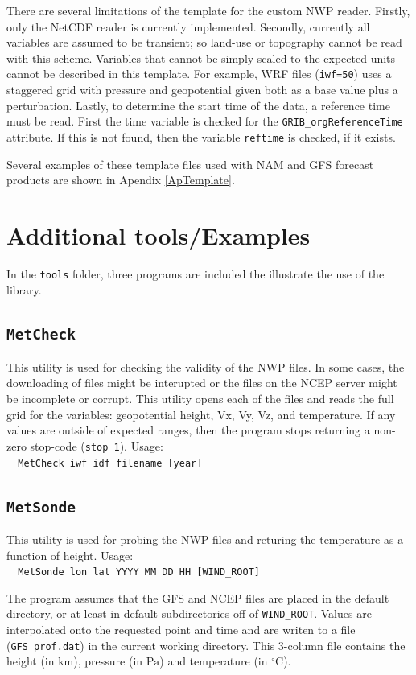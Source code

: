 \documentclass[11pt]{article}   %
\begin{document}
There are several limitations of the template for the custom NWP reader.  Firstly, only
the NetCDF reader is currently implemented.  Secondly, currently all variables are
assumed to be transient; so land-use or topography cannot be read with this scheme.
Variables that cannot be simply scaled to the expected units cannot be 
described in this template.  For example, WRF files (\verb|iwf=50|) uses a staggered
grid with pressure and geopotential given both as a base value plus a perturbation.
Lastly, to determine the start time of the data, a reference time must be read.  First
the time variable is checked for the \texttt{GRIB\_orgReferenceTime} attribute.  If this
is not found, then the variable \texttt{reftime} is checked, if it exists.

Several examples of these template files used with NAM and GFS
forecast products are shown in Apendix \ref{ApTemplate}.

\section{Additional tools/Examples}
In the \texttt{tools} folder, three programs are included the illustrate the
use of the library.
\subsection{\texttt{MetCheck}}
This utility is used for checking the validity of the NWP files.  In some
cases, the downloading of files might be interupted or the files on the
NCEP server might be incomplete or corrupt.  This utility opens each of the files
and reads the full grid for the variables: geopotential height, Vx, Vy, Vz, and
temperature.  If any values are outside of expected ranges, then the program
stops returning a non-zero stop-code (\verb|stop 1|).
Usage:\\
\verb|  MetCheck iwf idf filename [year]|

\subsection{\texttt{MetSonde}}
This utility is used for probing the NWP files and returing the temperature as a function
of height.  
Usage:\\
\verb|  MetSonde lon lat YYYY MM DD HH [WIND_ROOT]|

The program assumes that the GFS and NCEP files are placed in the default directory, or
at least in default subdirectories off of \texttt{WIND\_ROOT}.  Values are interpolated
onto the requested point and time and are writen to a file (\texttt{GFS\_prof.dat}) in
the current working directory.  This 3-column file contains the height (in $\mathrm{km}$),
pressure (in $\mathrm{Pa}$) and temperature (in $^{\circ}\mathrm{C}$).
\end{document}
